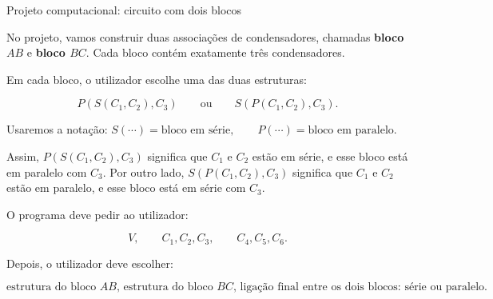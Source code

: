 \documentclass{beamer}
\begin{document}
\begin{frame}{Projeto computacional: circuito com dois blocos}
	\scriptsize
	
	No projeto, vamos construir duas associações de condensadores, chamadas
	\textbf{bloco \(AB\)} e \textbf{bloco \(BC\)}. Cada bloco contém exatamente
	três condensadores.
	
	\vspace{0.15cm}
	
	Em cada bloco, o utilizador escolhe uma das duas estruturas:
	
	\[
	P(S(C_1,C_2),C_3)
	\qquad \text{ou} \qquad
	S(P(C_1,C_2),C_3).
	\]
	
	Usaremos a notação:
	$
	S(\cdots)=\text{bloco em série},
	\qquad
	P(\cdots)=\text{bloco em paralelo}.
	$
	
	\vspace{0.3cm}
	
	Assim, \(P(S(C_1,C_2),C_3)\) significa que \(C_1\) e \(C_2\) estão em série,
	e esse bloco está em paralelo com \(C_3\). Por outro lado,
	\(S(P(C_1,C_2),C_3)\) significa que \(C_1\) e \(C_2\) estão em paralelo,
	e esse bloco está em série com \(C_3\).
	
	\vspace{0.15cm}
	
	O programa deve pedir ao utilizador:
	
	\[
	V,\qquad C_1,C_2,C_3,\qquad C_4,C_5,C_6.
	\]
	
	Depois, o utilizador deve escolher:
	
	\[
	\text{estrutura do bloco } AB,
	\,
	\text{estrutura do bloco } BC,
	\,
	\text{ligação final entre os dois blocos: série ou paralelo}.
	\]
	
\end{frame}
\end{document}
